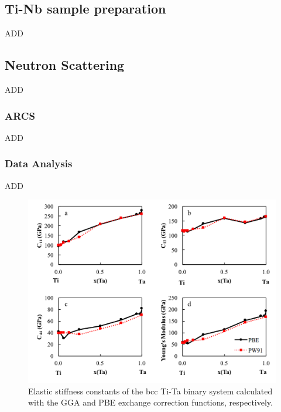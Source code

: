 \subsection{Ti-Nb sample preparation}

ADD

\subsection{Neutron Scattering}

ADD

\subsubsection{ARCS}

ADD

\subsubsection{Data Analysis}

ADD

\pagebreak
\begin{figure}[H]
	\centering
	\includegraphics[width=\textwidth]{Chapter-2/Figures/PBEvsPW91.png}
	\caption{Elastic stiffness constants of the bcc Ti-Ta binary system calculated with the GGA and PBE exchange correction functions, respectively.}
	\label{Ch2-figure:PBEvsPW91}
\end{figure}
